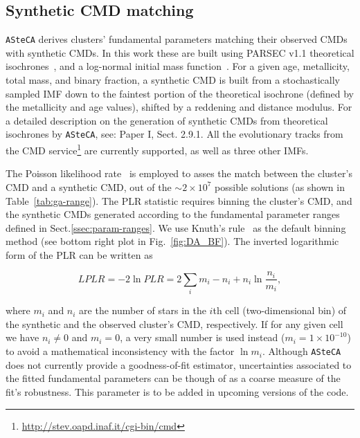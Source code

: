 \documentclass{aa}
\begin{document}
\subsection{Synthetic CMD matching}
\label{ssec:synth-match}

\texttt{ASteCA} derives clusters' fundamental parameters matching their observed
CMDs with synthetic CMDs. In this work these are built using PARSEC v1.1
theoretical isochrones~\citep[][B12]{Bressan_2012},
and a log-normal initial mass function~\citep[IMF,][]{Chabrier_2001}.
%
For a given age, metallicity, total mass, and binary fraction, a
synthetic CMD is built from a stochastically sampled IMF down to the
faintest portion of the theoretical isochrone (defined by the metallicity and
age values), shifted by a reddening and distance modulus. For a detailed
description on the generation of synthetic CMDs from theoretical
isochrones by \texttt{ASteCA}, see: Paper I, Sect. 2.9.1. All the evolutionary
tracks from the CMD service\footnote{\url{http://stev.oapd.inaf.it/cgi-bin/cmd}}
are currently supported, as well as three other IMFs.

The Poisson likelihood rate~\citep[PLR,][]{Dolphin_2002} is employed
to asses the match between the cluster's CMD and a synthetic
CMD, out of the ${\sim}2{\times}10^7$ possible solutions (as shown in
Table~\ref{tab:ga-range}).
The PLR statistic requires binning the cluster's CMD, and the synthetic CMDs
generated according to the fundamental parameter ranges defined in
Sect.\ref{ssec:param-ranges}.
We use Knuth's rule~\citep[][also implemented via the astroML package]
{Knuth_2006} as the default binning method (see bottom right plot in
Fig.~\ref{fig:DA_BF}).
The inverted logarithmic form of the PLR can be written as

\begin{equation}
LPLR  = -2 \ln PLR = 2 \sum_i m_i - n_i + n_i \ln \frac{n_i}{m_i},
\label{eq:likelihood}
\end{equation}

\noindent where $m_i$ and $n_i$ are the number of stars in the $i$th cell
(two-dimensional bin) of the synthetic and the observed cluster's CMD,
respectively. If for any given cell we have $n_i\neq0$ and $m_i=0$, a
very small number is used instead ($m_i=1{\times}10^{-10}$) to avoid a
mathematical inconsistency with the factor $\ln m_i$.
Although \texttt{ASteCA} does not currently provide a goodness-of-fit
estimator, uncertainties associated to the fitted fundamental parameters
can be though of as a coarse measure of the fit's robustness. This parameter is
to be added in upcoming versions of the code.
\end{document}
